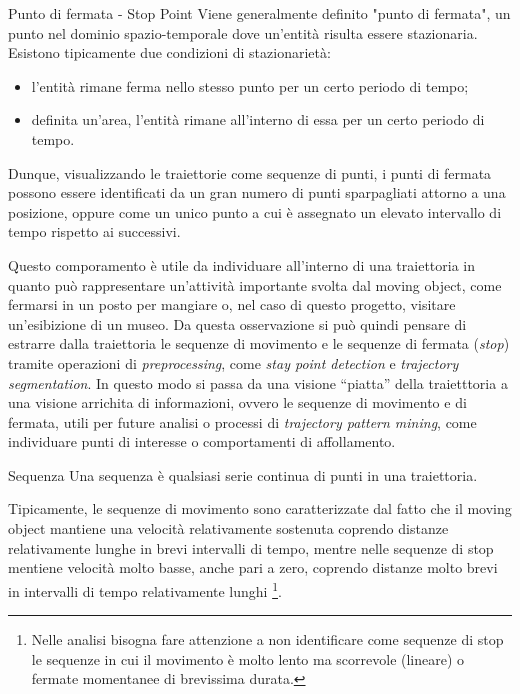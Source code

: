 \documentclass[12pt]{article}
\begin{document}
\begin{definition}{Punto di fermata - Stop Point}{}
    Viene generalmente definito "punto di fermata", un punto nel dominio spazio-temporale dove un'entità risulta essere stazionaria. Esistono tipicamente due condizioni di stazionarietà:
    \begin{itemize}
        \item l'entità rimane ferma nello stesso punto per un certo periodo di tempo;
        \item definita un'area, l'entità rimane all'interno di essa per un certo periodo di tempo.
    \end{itemize}
    Dunque, visualizzando le traiettorie come sequenze di punti, i punti di fermata possono essere identificati da un gran numero di punti sparpagliati attorno a una posizione, oppure come un unico punto a cui è assegnato un elevato intervallo di tempo rispetto ai successivi.
    \label{stop_point}
\end{definition}
Questo comporamento è utile da individuare all'interno di una traiettoria in quanto può rappresentare un'attività importante svolta dal moving object, come fermarsi in un posto per mangiare o, nel caso di questo progetto, visitare un'esibizione di un museo.
Da questa osservazione si può quindi pensare di estrarre dalla traiettoria le sequenze di movimento e le sequenze di fermata (\emph{stop}) tramite operazioni di \emph{preprocessing}, come \emph{stay point detection} e \emph{trajectory segmentation}.
In questo modo si passa da una visione “piatta” della traietttoria a una visione arrichita di informazioni, ovvero le sequenze di movimento e di fermata, utili per future analisi o processi di \emph{trajectory pattern mining}, come individuare punti di interesse o comportamenti di affollamento.
\begin{definition}{Sequenza}{}
    Una sequenza è qualsiasi serie continua di punti in una traiettoria.
\end{definition}
Tipicamente, le sequenze di movimento sono caratterizzate dal fatto che il moving object mantiene una velocità relativamente sostenuta coprendo distanze relativamente lunghe in brevi intervalli di tempo, mentre nelle sequenze di stop mentiene velocità molto basse, anche pari a zero, coprendo distanze molto brevi in intervalli di tempo relativamente lunghi
\footnote{Nelle analisi bisogna fare attenzione a non identificare come sequenze di stop le sequenze in cui il movimento è molto lento ma scorrevole (lineare) o fermate momentanee di brevissima durata.}.\\
\end{document}

